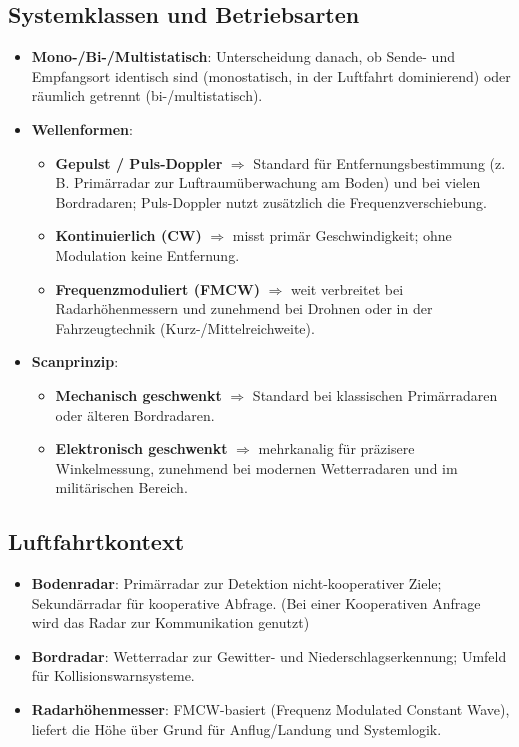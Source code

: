 \subsection{Systemklassen und Betriebsarten}
\begin{itemize}
  \item \textbf{Mono-/Bi-/Multistatisch}: Unterscheidung danach, ob Sende- und Empfangsort identisch sind
        (monostatisch, in der Luftfahrt dominierend) oder räumlich getrennt (bi-/multistatisch).
  \item \textbf{Wellenformen}:
    \begin{itemize}
      \item \textbf{Gepulst / Puls-Doppler} $\Rightarrow$ Standard für Entfernungsbestimmung (z.\,B. Primärradar zur Luftraumüberwachung am Boden)
            und bei vielen Bordradaren; Puls-Doppler nutzt zusätzlich die Frequenzverschiebung.
      \item \textbf{Kontinuierlich (CW)} $\Rightarrow$ misst primär Geschwindigkeit; ohne Modulation keine Entfernung.
      \item \textbf{Frequenzmoduliert (FMCW)} $\Rightarrow$ weit verbreitet bei Radarhöhenmessern und zunehmend bei Drohnen
            oder in der Fahrzeugtechnik (Kurz-/Mittelreichweite).
    \end{itemize}
  \item \textbf{Scanprinzip}:
    \begin{itemize}
      \item \textbf{Mechanisch geschwenkt} $\Rightarrow$ Standard bei klassischen Primärradaren oder älteren Bordradaren.
      \item \textbf{Elektronisch geschwenkt} $\Rightarrow$ mehrkanalig für präzisere Winkelmessung,
            zunehmend bei modernen Wetterradaren und im militärischen Bereich.
    \end{itemize}
\end{itemize}

\subsection{Luftfahrtkontext}
\begin{itemize}
  \item \textbf{Bodenradar}: Primärradar zur Detektion nicht-kooperativer Ziele;
        Sekundärradar für kooperative Abfrage. (Bei einer Kooperativen Anfrage wird das Radar zur Kommunikation genutzt)
  \item \textbf{Bordradar}: Wetterradar zur Gewitter- und Niederschlagserkennung; Umfeld für Kollisionswarnsysteme.
  \item \textbf{Radarhöhenmesser}: FMCW-basiert (Frequenz Modulated Constant Wave), liefert die Höhe über Grund für Anflug/Landung und Systemlogik.
\end{itemize}

